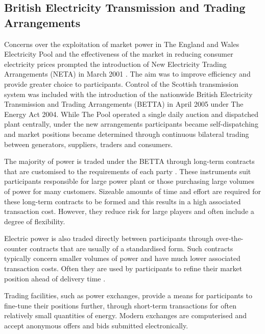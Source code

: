 \subsection{British Electricity Transmission and Trading Arrangements}
\label{sec:betta}
Concerns over the exploitation of market power in The England and Wales
Electricity Pool and the effectiveness of the market in reducing consumer
electricity prices prompted the introduction of New Electricity Trading
Arrangements (NETA) in March 2001 \cite{martoccia:2005}.  The aim was to
improve efficiency and provide greater choice to participants.  Control of the
Scottish transmission system was included with the introduction of the
nationwide British Electricity Transmission and Trading Arrangements (BETTA)
in April 2005 under The Energy Act 2004.  While The Pool operated a single
daily auction and dispatched plant centrally, under the new arrangements
participants became self-dispatching and market positions became determined
through continuous bilateral trading between generators, suppliers, traders
and consumers.

The majority of power is traded under the BETTA through long-term contracts
that are customised to the requirements of each party \cite{kirschen:book}.
These instruments suit participants responsible for large power plant or those
purchasing large volumes of power for many customers.  Sizeable amounts of time and
effort are required for these long-term contracts to be formed and this results
in a high associated transaction cost.  However, they reduce risk for large
players and often include a degree of flexibility.

Electric power is also traded directly between participants through
over-the-counter contracts that are usually of a standardised form.  Such contracts
typically concern smaller volumes of power and have much lower associated
transaction costs.  Often they are used by participants to refine their market
position ahead of delivery time \cite{kirschen:book}.

Trading facilities, such as power exchanges, provide a means for participants
to fine-tune their positions further, through short-term transactions for
often relatively small quantities of energy.  Modern exchanges are
computerised and accept anonymous offers and bids submitted electronically.

